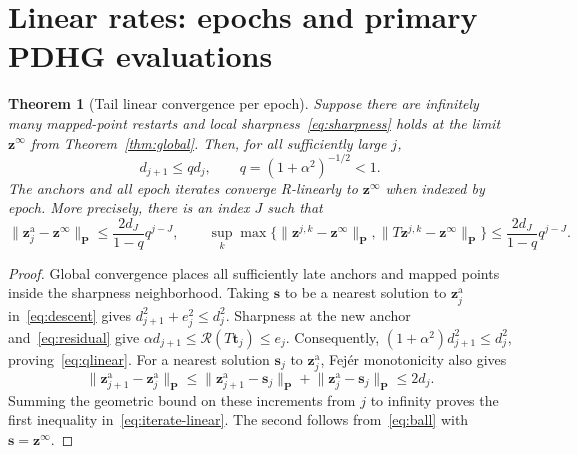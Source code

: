 \documentclass[11pt]{article}
\newtheorem{theorem}{Theorem}[section]
\theoremstyle{remark}
\newcommand{\np}[1]{\lVert#1\rVert_{\mathbf P}}
\newcommand{\res}{\mathcal R}
\begin{document}
\section{Linear rates: epochs and primary PDHG evaluations}

\begin{theorem}[Tail linear convergence per epoch]
\label{thm:epochlinear}
Suppose there are infinitely many mapped-point restarts and local sharpness~\eqref{eq:sharpness} holds at the limit $\mathbf z^\infty$ from Theorem~\ref{thm:global}.
Then, for all sufficiently large $j$,
\begin{equation}
d_{j+1}\leq qd_j,\qquad q=(1+\alpha^2)^{-1/2}<1.
\label{eq:qlinear}
\end{equation}
The anchors and all epoch iterates converge R-linearly to $\mathbf z^\infty$ when indexed by epoch.
More precisely, there is an index $J$ such that
\begin{equation}
\np{\mathbf z_j^{\mathrm a}-\mathbf z^\infty}\leq\frac{2d_J}{1-q}q^{j-J},\qquad \sup_k\max\{\np{\mathbf z^{j,k}-\mathbf z^\infty},\np{T\mathbf z^{j,k}-\mathbf z^\infty}\}\leq\frac{2d_J}{1-q}q^{j-J}.
\label{eq:iterate-linear}
\end{equation}
\end{theorem}

\begin{proof}
Global convergence places all sufficiently late anchors and mapped points inside the sharpness neighborhood.
Taking $\mathbf s$ to be a nearest solution to $\mathbf z_j^{\mathrm a}$ in~\eqref{eq:descent} gives $d_{j+1}^2+e_j^2\leq d_j^2$.
Sharpness at the new anchor and~\eqref{eq:residual} give $\alpha d_{j+1}\leq\res(T\mathbf t_j)\leq e_j$.
Consequently, $(1+\alpha^2)d_{j+1}^2\leq d_j^2$, proving~\eqref{eq:qlinear}.
For a nearest solution $\mathbf s_j$ to $\mathbf z_j^{\mathrm a}$, Fej\'er monotonicity also gives
\begin{equation}
\np{\mathbf z_{j+1}^{\mathrm a}-\mathbf z_j^{\mathrm a}}\leq\np{\mathbf z_{j+1}^{\mathrm a}-\mathbf s_j}+\np{\mathbf z_j^{\mathrm a}-\mathbf s_j}\leq2d_j.
\end{equation}
Summing the geometric bound on these increments from $j$ to infinity proves the first inequality in~\eqref{eq:iterate-linear}.
The second follows from~\eqref{eq:ball} with $\mathbf s=\mathbf z^\infty$.
\end{proof}
\end{document}
